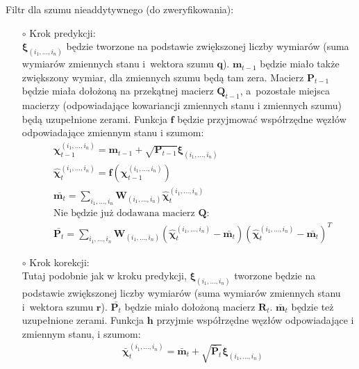 Filtr dla szumu nieaddytywnego (do zweryfikowania):
\begin{itemize}
	\item[$\circ$] Krok predykcji:\\
	$\boldsymbol{\xi}_{(i_1, \dots, i_n)}$ będzie tworzone na podstawie zwiększonej liczby wymiarów (suma wymiarów zmiennych stanu i~wektora szumu $\boldsymbol{q}$). $\boldsymbol{m}_{t-1}$ będzie miało także zwiększony wymiar, dla zmiennych szumu będą tam zera.
	Macierz $\boldsymbol{P}_{t-1}$ będzie miała dołożoną na przekątnej macierz $\boldsymbol{Q}_{t-1}$, a~pozostałe miejsca macierzy (odpowiadające kowariancji zmiennych stanu i zmiennych szumu) będą uzupełnione zerami. Funkcja $\boldsymbol{f}$ będzie przyjmować współrzędne węzłów odpowiadające zmiennym stanu i szumom:
	\begin{align}\label{eq:GHKFNonAdditivePrediction}
	&\boldsymbol{\chi}^{(i_1, \dots, i_n)}_{t-1}=\boldsymbol{m}_{t-1}+\sqrt{\boldsymbol{P}_{t-1}}\boldsymbol{\xi}_{(i_1, \dots, i_n)} \nonumber \\
	&\hat{\boldsymbol{\chi}}^{(i_1, \dots, i_n)}_{t}=\boldsymbol{f}(\boldsymbol{\chi}^{(i_1, \dots, i_n)}_{t-1}) \nonumber \\
	&\bar{\boldsymbol{m}_t}=\sum_{i_1,\dots,i_n} \boldsymbol{W}_{(i_1, \dots, i_n)} \hat{\boldsymbol{\chi}}^{(i_1, \dots, i_n)}_{t} \nonumber \\
	&\text{Nie będzie już dodawana macierz $\boldsymbol{Q}$:} \nonumber \\
	&\bar{\boldsymbol{P}_t}=\sum_{i_1,\dots,i_n} \boldsymbol{W}_{(i_1, \dots, i_n)}(\hat{\boldsymbol{\chi}}^{(i_1, \dots, i_n)}_{t} - \bar{\boldsymbol{m}_t})(\hat{\boldsymbol{\chi}}^{(i_1, \dots, i_n)}_{t} - \bar{\boldsymbol{m}_t})^T
	\end{align}
	\item[$\circ$] Krok korekcji:\\
	Tutaj podobnie jak w kroku predykcji, $\boldsymbol{\xi}_{(i_1, \dots, i_n)}$ tworzone będzie na podstawie zwiększonej liczby wymiarów (suma wymiarów zmiennych stanu i~wektora szumu $\boldsymbol{r}$). $\bar{\boldsymbol{P}_t}$ będzie miało dołożoną macierz $\boldsymbol{R}_{t}$. $\bar{\boldsymbol{m}}_{t}$ będzie też uzupełnione zerami. Funkcja $\boldsymbol{h}$ przyjmie współrzędne węzłów odpowiadające i zmiennym stanu, i szumom:
	\begin{align} \label{eq:GHKFNonAdditiveCorrection}
	&\bar{\boldsymbol{\chi}}^{(i_1, \dots, i_n)}_{t} = \bar{\boldsymbol{m}}_{t} + \sqrt{\bar{\boldsymbol{P}}_{t}} \boldsymbol{\xi}_{(i_1, \dots, i_n)} \nonumber \\

\end{align}
\end{itemize}
